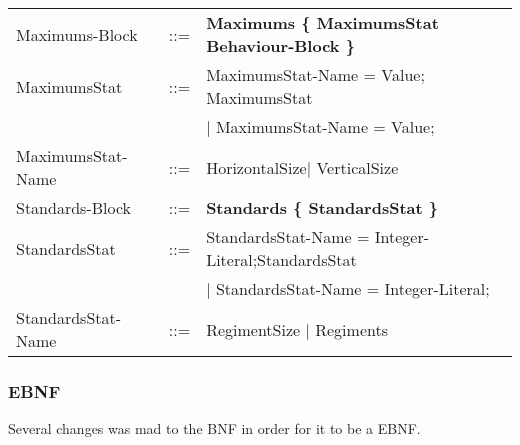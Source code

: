 \begin{tabular}{ l l l }
			Maximums-Block	   &	::=	 & \bf{Maximums} \bf{\{} MaximumsStat Behaviour-Block \bf{\}}	\\
			MaximumsStat	   &	::=  & MaximumsStat-Name = Value; MaximumsStat  \\
							   &		 & $\mid$ MaximumsStat-Name = Value;   \\
			MaximumsStat-Name  &	::=  & HorizontalSize$\mid$ VerticalSize					\\
			Standards-Block	   &    ::=  & \bf{Standards} \bf{\{ } StandardsStat \bf{\} }	\\
			StandardsStat	   & 	::=	 & StandardsStat-Name = Integer-Literal;StandardsStat \\
							   &		 & $\mid$ StandardsStat-Name = Integer-Literal; \\
			StandardsStat-Name & 	::=	 & RegimentSize	$\mid$ Regiments \\
		\end{tabular}
		
	\subsubsection{EBNF}
		Several changes was mad to the BNF in order for it to be a EBNF.
		